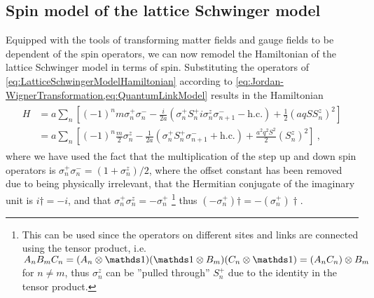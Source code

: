 \documentclass[../main.tex]{subfiles} %
\begin{document}
\subsection{Spin model of the lattice Schwinger model} \label{sec:SpinModelOfTheLatticeSchwingerModel}

Equipped with the tools of transforming matter fields and gauge fields to be dependent of the spin operators, we can now remodel the Hamiltonian of the lattice Schwinger model in terms of spin. Substituting the operators of \cref{eq:LatticeSchwingerModelHamiltonian} according to \cref{eq:Jordan-WignerTransformation,eq:QuantumLinkModel} results in the Hamiltonian
\begin{align} \label{eq:LatticeSchwingerModelHamiltonianSpin}
\begin{split}
    H &= a \sum_n \left[ (-1)^n m \sigma_n^+ \sigma_n^- - \frac{i}{2a} \left( \sigma_n^+ S_n^+ i \sigma_n^z \sigma_{n+1}^- - \mathrm{h.c.} \right) + \frac{1}{2} \left( aq S S_n^z \right)^2 \right] \\
        &= a \sum_n \left[ (-1)^n \frac{m}{2} \sigma_n^z - \frac{1}{2a} \left( \sigma_n^+ S_n^+ \sigma_{n+1}^- + \mathrm{h.c.} \right) + \frac{a^2 q^2 S^2}{2} \left( S_n^z \right)^2 \right] \: ,
\end{split}
\end{align}
where we have used the fact that the multiplication of the step up and down spin operators is $\sigma_n^+ \sigma_n^- = (1 + \sigma_n^z)/2$, where the offset constant has been removed due to being physically irrelevant, that the Hermitian conjugate of the imaginary unit is $i\dagger = -i$, and that $\sigma_n^+ \sigma_n^z = -\sigma_n^+$ \footnote{This can be used since the operators on different sites and links are connected using the tensor product, i.e. $A_n B_m C_n = (A_n \otimes \id) (\id \otimes B_m) (C_n \otimes \id) = (A_n C_n) \otimes B_m$ for $n \ne m$, thus $\sigma_n^z$ can be ''pulled through'' $S_n^+$ due to the identity in the tensor product.} thus $(-\sigma_n^+)\dagger = - (\sigma_n^+)\dagger$.
\end{document}
